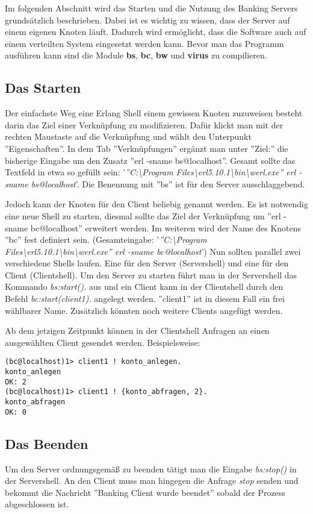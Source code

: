 
Im folgenden Abschnitt wird das Starten und die Nutzung des Banking Servers grundsätzlich beschrieben. Dabei ist es wichtig zu wissen, dass der Server auf einem eigenen Knoten läuft. Dadurch wird ermöglicht, dass die Software auch auf einem verteilten System eingesetzt werden kann. Bevor man das Programm ausführen kann sind die Module \textbf{bs}, \textbf{bc}, \textbf{bw} und \textbf{virus} zu compilieren.

\subsection{Das Starten}

Der einfachste Weg eine Erlang Shell einem gewissen Knoten zuzuweisen besteht darin das Ziel einer Verknüpfung zu modifizieren. Dafür klickt man mit der rechten Maustaste auf die Verknüpfung und wählt den Unterpunkt ''Eigenschaften''.  In dem Tab ''Verknüpfungen'' ergänzt man unter ''Ziel:'' die bisherige Eingabe um den Zusatz ''erl -sname bs@localhost''. Gesamt sollte das Textfeld in etwa so gefüllt sein: '\textit{''C:\textbackslash Program Files\textbackslash erl5.10.1\textbackslash bin\textbackslash werl.exe'' erl -sname bs@localhost}'. Die Benennung mit ''bs'' ist für den Server ausschlaggebend.

Jedoch kann der Knoten für den Client beliebig genannt werden. Es ist notwendig eine neue Shell zu starten, diesmal sollte das Ziel der Verknüpfung um ''erl -sname bc@localhost'' erweitert werden. Im weiteren wird der Name des Knotens ''bc'' fest definiert sein. (Gesamteingabe: '\textit{''C:\textbackslash Program Files\textbackslash erl5.10.1\textbackslash bin\textbackslash werl.exe'' erl -sname bc@localhost}') Nun sollten parallel zwei verschiedene Shells laufen. Eine für den Server (Servershell) und eine für den Client (Clientshell). Um den Server zu starten führt man in der Servershell das Kommando \textit{bs:start().} aus und ein Client kann in der Clientshell durch den Befehl \textit{bc:start(client1).} angelegt werden. ''client1'' ist in diesem Fall ein frei wählbarer Name. Zusätzlich könnten noch weitere Clients angefügt werden.

Ab dem jetzigen Zeitpunkt können in der Clientshell Anfragen an einen ausgewählten Client gesendet werden. Beispielsweise:

\begin{lstlisting} 
(bc@localhost)1> client1 ! konto_anlegen.
konto_anlegen
OK: 2
(bc@localhost)1> client1 ! {konto_abfragen, 2}.
konto_abfragen
OK: 0
\end{lstlisting}

\subsection{Das Beenden}

Um den Server ordnungsgemäß zu beenden tätigt man die Eingabe \textit{bs:stop()} in der Servershell. An den Client muss man hingegen die Anfrage \textit{stop} senden und bekommt die Nachricht ''Banking Client wurde beendet'' sobald der Prozess abgeschlossen ist.